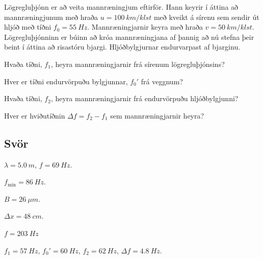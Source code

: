 \begin{enumerate}[label = \textbf{Dæmi \thechapter.\arabic*.}]
\begin{minipage}{\linewidth}
\item Lögregluþjónn er að veita mannræningjum eftirför. Hann keyrir í áttina að mannræningjunum með hraða $u = \SI{100}{km/klst}$ með kveikt á sírenu sem sendir út hljóð með tíðni $f_0 = \SI{55}{Hz}$. Mannræningjarnir keyra með hraða $v = \SI{50}{km/klst}$. Lögregluþjónninn er búinn að króa mannræningjana af þannig að nú stefna þeir beint í áttina að risastóru bjargi. Hljóðbylgjurnar endurvarpast af bjarginu. \begin{enumerate*}[label = \textbf{(\alph*)}]
    \item Hvaða tíðni, $f_1$, heyra mannræningjarnir frá sírenum lögregluþjónsins?
    \item Hver er tíðni endurvörpuðu bylgjunnar, $f_0'$ frá veggnum?
    \item Hvaða tíðni, $f_2$, heyra mannræningjarnir frá endurvörpuðu hljóðbylgjunni?
    \item Hver er hviðutíðnin $\Delta f = f_2 - f_1$ sem mannræningjarnir heyra?
\end{enumerate*}  

\end{minipage}

\end{enumerate}

\subsection*{Svör}

\begin{enumerate*}[label = \vspace{0.15cm} \textbf{(\arabic*)}]
    \setcounter{enumi}{35}
  \item $\lambda = \SI{5.0}{m}$, $f = \SI{69}{Hz}$.
  \item $f_{\text{min}} = \SI{86}{Hz}$.
  \item $B = \SI{26}{\mu m}$.
  \item $\Delta x = \SI{48}{cm}$.
  \item $f = \SI{203}{Hz}$
  \item $f_1 = \SI{57}{Hz}$, $f_0' = \SI{60}{Hz}$, $f_2 = \SI{62}{Hz}$, $\Delta f = \SI{4.8}{Hz}$.
\end{enumerate*}

\newpage